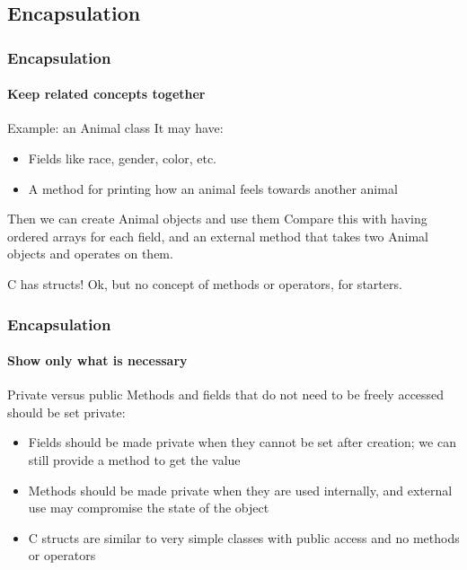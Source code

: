 \subsection{Encapsulation}

\begin{frame}
\frametitle{Encapsulation}
\framesubtitle{Keep related concepts together}

\begin{block}{Example: an Animal class}
It may have:
\begin{itemize}
\item Fields like race, gender, color, etc.
\item A method for printing how an animal feels towards another animal
\end{itemize}
\end{block}
\pause
\begin{block}{Then we can create Animal objects and use them}
Compare this with having ordered arrays for each field, and an external method that takes two Animal objects and operates on them.
\end{block}
\pause
\begin{block}{C has structs!}
Ok, but no concept of methods or operators, for starters.
\end{block}

\end{frame}

\begin{frame}
\frametitle{Encapsulation}
\framesubtitle{Show only what is necessary}

\begin{block}{Private versus public}
Methods and fields that do not need to be freely accessed should be set private:
\begin{itemize}
\item Fields should be made private when they cannot be set after creation; we can still provide a method to get the value
\item Methods should be made private when they are used internally, and external use may compromise the state of the object
\end{itemize}
\end{block}
\pause
\begin{itemize}
\item C structs are similar to very simple classes with public access and no methods or operators
\end{itemize}

\end{frame}

